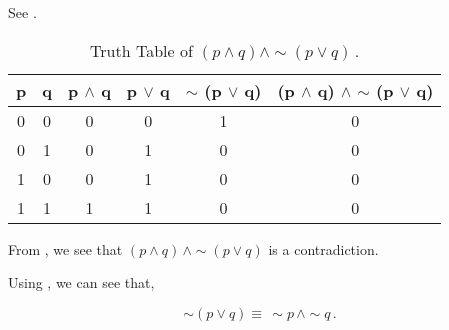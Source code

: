 %
%

\begin{subquestions}


\subquestion

See .

\begin{table}[ht]
	\centering
	\begin{tabular}{|c|c|c|c|c|c|}
		\hline
		p & q & p $\land$ q & p $\lor$ q & $\sim$ (p $\lor$ q) & (p $\land$ q) $\land$ $\sim$ (p $\lor$ q) \\
		\hline
		0 & 0 & 0 & 0 & 1 & 0 \\
		0 & 1 & 0 & 1 & 0 & 0 \\
		1 & 0 & 0 & 1 & 0 & 0 \\
		1 & 1 & 1 & 1 & 0 & 0 \\
		\hline
	\end{tabular}
	\caption{\label{2013:q1:tab:TruthTab1} Truth Table of $(p \land q) \land \sim (p \lor q)$\,.}
\end{table}


\subquestion

From , we see that $(p \land q)\, \land \sim (p \lor q)$ is a contradiction.


\subquestion

Using , we can see that,

\begin{equation}
	\sim (p \lor q) \equiv \, \sim p \, \land \sim q \,.
\end{equation}


\end{subquestions}
